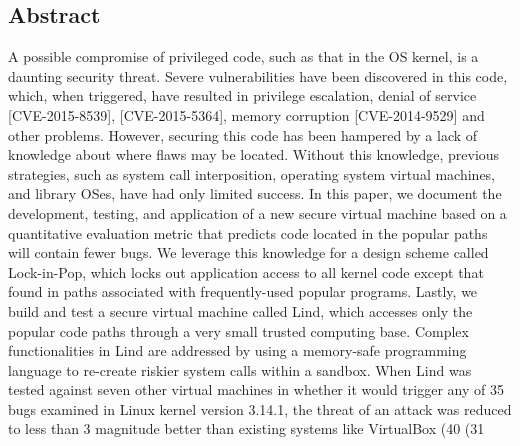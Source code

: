 \subsection*{Abstract}
A possible compromise of privileged code, such as that in the OS kernel, is a
daunting security threat. Severe vulnerabilities have been discovered in this
code, which, when triggered, have resulted in privilege escalation,
denial of service [CVE-2015-8539], [CVE-2015-5364], memory corruption
 [CVE-2014-9529] and other problems. However, securing this code has been hampered
  by a lack of knowledge about where flaws may be located. Without this knowledge,
 previous strategies, such as system call interposition, operating system virtual
 machines, and library OSes, have had only limited success. In this paper, we
 document the development, testing, and application of a new secure virtual
 machine based on a quantitative evaluation metric that predicts code located
  in the popular paths will contain fewer bugs. We leverage this knowledge
  for a design scheme called  Lock-in-Pop, which locks out application access
 to all kernel code except that found in paths associated with frequently-used
 popular programs. Lastly, we build and test  a secure virtual machine called Lind,
  which accesses only the popular code paths through a very small trusted computing
   base. Complex functionalities in Lind are addressed by using a memory-safe
    programming language to re-create riskier system calls within a sandbox.
  When Lind was  tested against seven other virtual machines in whether it would
   trigger any of 35 bugs examined in Linux kernel version 3.14.1, the threat of
    an attack was reduced to less than 3%
    magnitude better than existing systems like VirtualBox (40%
     (31%
